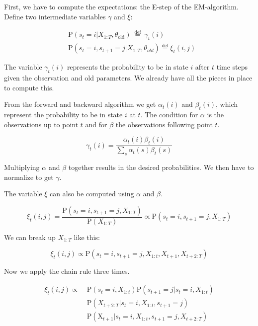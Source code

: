 First, we have to compute the expectations: the E-step of the EM-algorithm. Define two intermediate variables $\gamma$ and $\xi$: 

\begin{equation}
  \begin{aligned}
&\mathrm{P}\left(s_{t}=i | X_{1: T}, \theta_{\text {old}}\right) \stackrel{\text { def }}{=} \gamma_{t}(i)\\
&\mathrm{P}\left(s_{t}=i, s_{t+1}=j | X_{1: T}, \theta_{o l d}\right) \stackrel{\mathrm{def}}{=} \xi_{t}(i, j)
\end{aligned} 
\end{equation}

The variable $\gamma_t(i)$ represents the probability to be in state $i$ after $t$ time steps given the observation and old parameters. We already have all the pieces in place to compute this.

From the forward and backward algorithm we get $\alpha_t(i)$ and $\beta_t(i)$, which represent the probability to be in state $i$ at $t$. The condition for $\alpha$ is the observations up to point $t$ and for $\beta$ the observations following point $t$.

\begin{equation}
   \gamma_t(i) = \frac{\alpha_{t}(i) \beta_{t}(i)}{\sum_{s} \alpha_{t}(s) \beta_{t}(s)}
\end{equation}

Multiplying $\alpha$ and $\beta$ together results in the desired probabilities. We then have to normalize to get $\gamma$. 

The variable $\xi$ can also be computed using $\alpha$ and $\beta$. 

\begin{equation}
   \xi_{t}(i, j)=\frac{\mathrm{P}\left(s_{t}=i, s_{t+1}=j, X_{1: T}\right)}{\mathrm{P}\left(X_{1: T}\right)} \propto \mathrm{P}\left(s_{t}=i, s_{t+1}=j, X_{1: T}\right)
\end{equation}

We can break up $X_{1:T}$ like this:

\begin{equation}
   \xi_{t}(i, j) \propto \mathrm{P}\left(s_{t}=i, s_{t+1}=j, X_{1: t}, X_{t+1},X_{t+2:T}\right)
\end{equation}

Now we apply the chain rule three times.

\begin{equation}
  \begin{aligned}
\xi_{t}(i, j) \propto \;  &\mathrm{P}\left(s_{t}=i, X_{1: t}\right) \mathrm{P}\left(s_{t+1}=j | s_{t}=i, X_{1: t}\right) \\
&\mathrm{P}\left(X_{t+2: T} | s_{t}=i, X_{1: t}, s_{t+1}=j\right) \\
&\mathrm{P}\left(\mathrm{X}_{t+1} | s_{t}=i, X_{1: t}, s_{t+1}=j, X_{t+2: T}\right)
\end{aligned} 
\end{equation}


